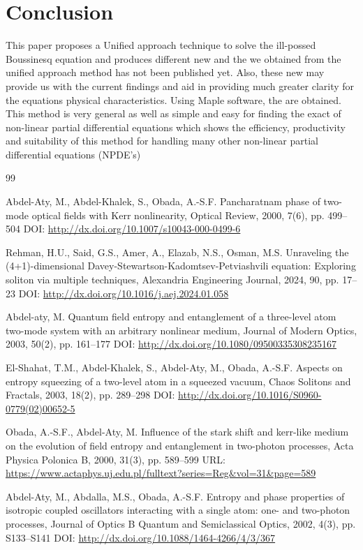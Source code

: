 \documentclass[10pt]{NSP1}
\numberwithin{equation}{section}
\begin{document}
\section{Conclusion}\label{s5}
\noindent This paper proposes a Unified approach technique to solve the ill-possed Boussinesq equation and produces different new  and the  we obtained from the unified approach method has not been published yet. Also, these new  may provide us with the current findings and aid in providing much greater clarity for the equations physical characteristics. Using Maple software, the  are obtained. This method is very general as well as simple and easy for finding the exact  of non-linear partial differential equations which shows the efficiency, productivity and suitability of this method for handling many other non-linear partial differential equations (NPDE's)
\begin{thebibliography}{99}

 Abdel-Aty, M., Abdel-Khalek, S., Obada, A.-S.F.
Pancharatnam phase of two-mode optical fields with Kerr nonlinearity, Optical Review, 2000, 7(6), pp. 499--504 DOI: \url{http://dx.doi.org/10.1007/s10043-000-0499-6}

 Rehman, H.U., Said, G.S., Amer, A., Elazab, N.S., Osman, M.S.
Unraveling the (4+1)-dimensional Davey-Stewartson-Kadomtsev-Petviashvili equation: Exploring soliton  via multiple techniques, Alexandria Engineering Journal, 2024, 90, pp. 17--23 DOI: \url{http://dx.doi.org/10.1016/j.aej.2024.01.058}

 Abdel-aty, M.
Quantum field entropy and entanglement of a three-level atom two-mode system with an arbitrary nonlinear medium, Journal of Modern Optics, 2003, 50(2), pp. 161--177 DOI: \url{http://dx.doi.org/10.1080/09500335308235167}

 El-Shahat, T.M., Abdel-Khalek, S., Abdel-Aty, M., Obada, A.-S.F.
Aspects on entropy squeezing of a two-level atom in a squeezed vacuum, Chaos Solitons and Fractals, 2003, 18(2), pp. 289--298 DOI: \url{http://dx.doi.org/10.1016/S0960-0779(02)00652-5}

 Obada, A.-S.F., Abdel-Aty, M.
Influence of the stark shift and kerr-like medium on the evolution of field entropy and entanglement in two-photon processes, Acta Physica Polonica B, 2000, 31(3), pp. 589--599 URL: \url{https://www.actaphys.uj.edu.pl/fulltext?series=Reg&vol=31&page=589}

 Abdel-Aty, M., Abdalla, M.S., Obada, A.-S.F.
Entropy and phase properties of isotropic coupled oscillators interacting with a single atom: one- and two-photon processes, Journal of Optics B Quantum and Semiclassical Optics, 2002, 4(3), pp. S133--S141 DOI: \url{http://dx.doi.org/10.1088/1464-4266/4/3/367}


\end{thebibliography}
\end{document}
